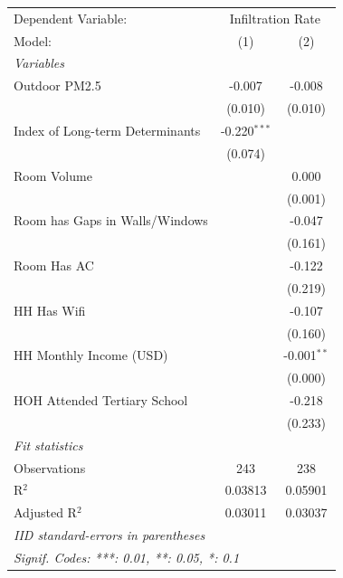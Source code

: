 
\begingroup
\centering
\begin{tabular}{lcc}
   \tabularnewline \midrule \midrule
   Dependent Variable: & \multicolumn{2}{c}{Infiltration Rate}\\
   Model:                          & (1)            & (2)\\  
   \midrule
   \emph{Variables}\\
   Outdoor PM2.5                   & -0.007         & -0.008\\   
                                   & (0.010)        & (0.010)\\   
   Index of Long-term Determinants & -0.220$^{***}$ &   \\   
                                   & (0.074)        &   \\   
   Room Volume                     &                & 0.000\\   
                                   &                & (0.001)\\   
   Room has Gaps in Walls/Windows  &                & -0.047\\   
                                   &                & (0.161)\\   
   Room Has AC                     &                & -0.122\\   
                                   &                & (0.219)\\   
   HH Has Wifi                     &                & -0.107\\   
                                   &                & (0.160)\\   
   HH Monthly Income (USD)         &                & -0.001$^{**}$\\   
                                   &                & (0.000)\\   
   HOH Attended Tertiary School    &                & -0.218\\   
                                   &                & (0.233)\\   
   \midrule
   \emph{Fit statistics}\\
   Observations                    & 243            & 238\\  
   R$^2$                           & 0.03813        & 0.05901\\  
   Adjusted R$^2$                  & 0.03011        & 0.03037\\  
   \midrule \midrule
   \multicolumn{3}{l}{\emph{IID standard-errors in parentheses}}\\
   \multicolumn{3}{l}{\emph{Signif. Codes: ***: 0.01, **: 0.05, *: 0.1}}\\
\end{tabular}
\par\endgroup



